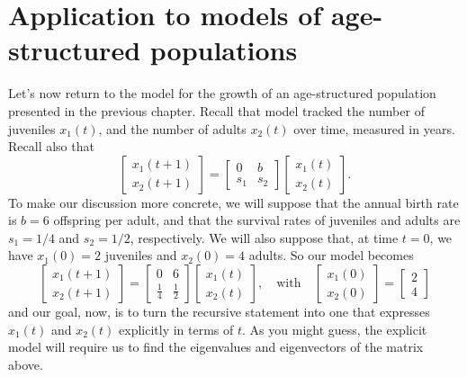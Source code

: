 \documentclass[../book.tex]{subfiles}
\begin{document}
\section{Application to models of age-structured populations}

Let's now return to the model for the growth of an age-structured population presented in the previous chapter. Recall that model tracked the number of juveniles \(x_1(t)\), and the number of adults \(x_2(t)\) over time, measured in years. Recall also that
\begin{equation}\label{eq:eig-28}
\begin{bmatrix}
  x_1 (t+1) \\ x_2(t+1)
\end{bmatrix}
=
\begin{bmatrix}
  0 & b \\ s_1 & s_2
\end{bmatrix}
\begin{bmatrix}
  x_1 (t) \\ x_2(t)
\end{bmatrix}.
\end{equation}
To make our discussion more concrete, we will suppose that the annual birth rate is \(b=6\) offspring per adult, and that the survival rates of juveniles and adults are \(s_1=1/4\) and \(s_2=1/2\), respectively. We will also suppose that, at time \(t=0\), we have \(x_1(0) = 2\) juveniles and \(x_2(0) = 4\) adults. So our model becomes
\begin{equation}\label{eq:eig-29}
\begin{bmatrix}
  x_1 (t+1) \\ x_2(t+1)
\end{bmatrix}
=
\begin{bmatrix}
  0 & 6 \\ \frac{1}{4} & \frac{1}{2}
\end{bmatrix}
\begin{bmatrix}
  x_1 (t) \\ x_2(t)
\end{bmatrix},
\quad \text{with}\quad
\begin{bmatrix}
  x_1(0) \\ x_2(0)
\end{bmatrix}
=
\begin{bmatrix}
  2 \\ 4
\end{bmatrix}
\end{equation}
and our goal, now, is to turn the recursive statement into one that expresses \(x_1(t)\) and \(x_2(t)\) explicitly in terms of \(t\). As you might guess, the explicit model will require us to find the eigenvalues and eigenvectors of the matrix above.
\end{document}
